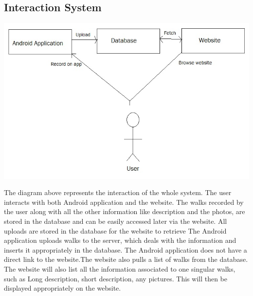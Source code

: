 \documentclass[12pt]{article}
\begin{document}
\subsection{Interaction System}
\includegraphics[scale=0.60]{Project_Plan/docs/system_interaction.jpg}
\par{The diagram above represents the interaction of the whole system. The user interacts with both Android application and the website. The walks recorded by the user along with all the other information like description and the photos, are stored in the database and can be easily accessed later via the website. All uploads are stored in the database for the website to retrieve
The Android application uploads walks to the server, which deals with the information and inserts it appropriately in the database. The Android application does not have a direct link to the website.The website also pulls a list of walks from the database. The website will also list all the information associated to one singular walks, such as Long description, short description, any pictures. This will then be displayed appropriately on the website.}
\end{document}
